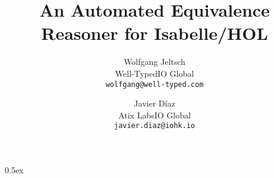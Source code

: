 \documentclass[a4paper,11pt]{article}
\newcommand{\authorinfo}[3]
    {#1\medskip\\\small#2\smallskip\\\small\texttt{#3}}
\newcommand{\andalso}
    {\quad\enspace}
\begin{document}
\title{An Automated Equivalence Reasoner for Isabelle/HOL}
\author{%
    \authorinfo
        {Wolfgang Jeltsch}
        {Well-Typed\andalso IO Global}
        {wolfgang@well-typed.com}%
    \and
    \authorinfo
        {Javier Díaz}
        {Atix Labs\andalso IO Global}
        {javier.diaz@iohk.io}%
}

\maketitle

\tableofcontents

\parindent 0pt\parskip 0.5ex


\end{document}
